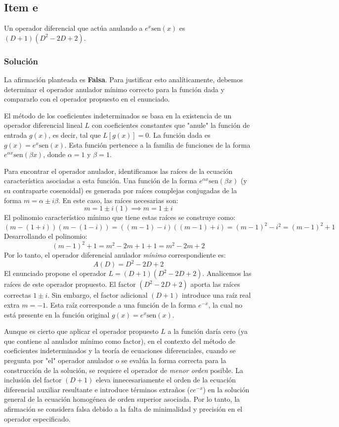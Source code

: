 \documentclass[a4paper]{article}
\begin{document}
\subsection{Item e}
Un operador diferencial que actúa anulando a $e^x \text{sen}(x)$ es $(D+1)(D^2 - 2D + 2)$.

\subsubsection{Solución}
La afirmación planteada es \textbf{Falsa}. Para justificar esto analíticamente, debemos determinar el operador anulador mínimo correcto para la función dada y compararlo con el operador propuesto en el enunciado.

El método de los coeficientes indeterminados se basa en la existencia de un operador diferencial lineal $L$ con coeficientes constantes que "anule" la función de entrada $g(x)$, es decir, tal que $L[g(x)] = 0$. La función dada es $g(x) = e^x \text{sen}(x)$. Esta función pertenece a la familia de funciones de la forma $e^{\alpha x} \text{sen}(\beta x)$, donde $\alpha = 1$ y $\beta = 1$.

Para encontrar el operador anulador, identificamos las raíces de la ecuación característica asociadas a esta función. Una función de la forma $e^{\alpha x} \text{sen}(\beta x)$ (y su contraparte cosenoidal) es generada por raíces complejas conjugadas de la forma $m = \alpha \pm i\beta$. En este caso, las raíces necesarias son:
$$
m = 1 \pm i(1) \implies m = 1 \pm i
$$
El polinomio característico mínimo que tiene estas raíces se construye como:
$$
(m - (1+i))(m - (1-i)) = ((m-1) - i)((m-1) + i) = (m-1)^2 - i^2 = (m-1)^2 + 1
$$
Desarrollando el polinomio:
$$
(m-1)^2 + 1 = m^2 - 2m + 1 + 1 = m^2 - 2m + 2
$$
Por lo tanto, el operador diferencial anulador \textit{mínimo} correspondiente es:
$$
A(D) = D^2 - 2D + 2
$$
El enunciado propone el operador $L = (D+1)(D^2 - 2D + 2)$. Analicemos las raíces de este operador propuesto. El factor $(D^2 - 2D + 2)$ aporta las raíces correctas $1 \pm i$. Sin embargo, el factor adicional $(D+1)$ introduce una raíz real extra $m = -1$. Esta raíz corresponde a una función de la forma $e^{-x}$, la cual no está presente en la función original $g(x) = e^x \text{sen}(x)$.

Aunque es cierto que aplicar el operador propuesto $L$ a la función daría cero (ya que contiene al anulador mínimo como factor), en el contexto del método de coeficientes indeterminados y la teoría de ecuaciones diferenciales, cuando se pregunta por "el" operador anulador o se evalúa la forma correcta para la construcción de la solución, se requiere el operador de \textit{menor orden} posible. La inclusión del factor $(D+1)$ eleva innecesariamente el orden de la ecuación diferencial auxiliar resultante e introduce términos extraños ($c e^{-x}$) en la solución general de la ecuación homogénea de orden superior asociada. Por lo tanto, la afirmación se considera falsa debido a la falta de minimalidad y precisión en el operador especificado.
\end{document}
